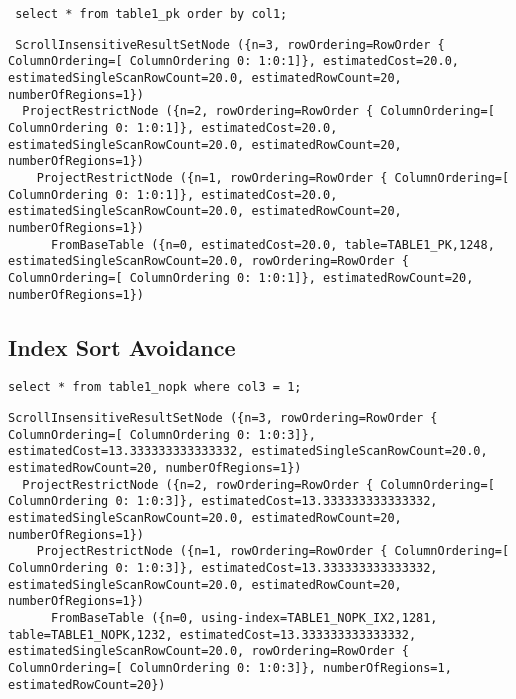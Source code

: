 \begin{verbatim}    
 select * from table1_pk order by col1;
\end{verbatim}
 
\begin{verbatim}
 ScrollInsensitiveResultSetNode ({n=3, rowOrdering=RowOrder { ColumnOrdering=[ ColumnOrdering 0: 1:0:1]}, estimatedCost=20.0, estimatedSingleScanRowCount=20.0, estimatedRowCount=20, numberOfRegions=1})
  ProjectRestrictNode ({n=2, rowOrdering=RowOrder { ColumnOrdering=[ ColumnOrdering 0: 1:0:1]}, estimatedCost=20.0, estimatedSingleScanRowCount=20.0, estimatedRowCount=20, numberOfRegions=1})
    ProjectRestrictNode ({n=1, rowOrdering=RowOrder { ColumnOrdering=[ ColumnOrdering 0: 1:0:1]}, estimatedCost=20.0, estimatedSingleScanRowCount=20.0, estimatedRowCount=20, numberOfRegions=1})
      FromBaseTable ({n=0, estimatedCost=20.0, table=TABLE1_PK,1248, estimatedSingleScanRowCount=20.0, rowOrdering=RowOrder { ColumnOrdering=[ ColumnOrdering 0: 1:0:1]}, estimatedRowCount=20, numberOfRegions=1})
\end{verbatim}

      
\subsection{Index Sort Avoidance}

\begin{verbatim}
select * from table1_nopk where col3 = 1;             
\end{verbatim}

\begin{verbatim}
ScrollInsensitiveResultSetNode ({n=3, rowOrdering=RowOrder { ColumnOrdering=[ ColumnOrdering 0: 1:0:3]}, estimatedCost=13.333333333333332, estimatedSingleScanRowCount=20.0, estimatedRowCount=20, numberOfRegions=1})
  ProjectRestrictNode ({n=2, rowOrdering=RowOrder { ColumnOrdering=[ ColumnOrdering 0: 1:0:3]}, estimatedCost=13.333333333333332, estimatedSingleScanRowCount=20.0, estimatedRowCount=20, numberOfRegions=1})
    ProjectRestrictNode ({n=1, rowOrdering=RowOrder { ColumnOrdering=[ ColumnOrdering 0: 1:0:3]}, estimatedCost=13.333333333333332, estimatedSingleScanRowCount=20.0, estimatedRowCount=20, numberOfRegions=1})
      FromBaseTable ({n=0, using-index=TABLE1_NOPK_IX2,1281, table=TABLE1_NOPK,1232, estimatedCost=13.333333333333332, estimatedSingleScanRowCount=20.0, rowOrdering=RowOrder { ColumnOrdering=[ ColumnOrdering 0: 1:0:3]}, numberOfRegions=1, estimatedRowCount=20})
\end{verbatim}

